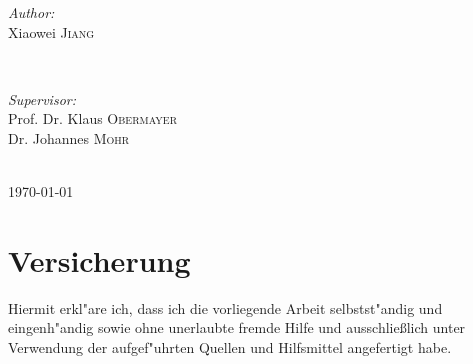 \documentclass[12pt,english,german,a4paper,twoside]{report}
\begin{document}
\begin{titlepage}
	\begin{minipage}{0.3\textwidth}
		\begin{flushleft} \large
			\emph{Author:}\\
			Xiaowei \textsc{Jiang} %
		\end{flushleft}
	\end{minipage}
	~
	\begin{minipage}{0.6\textwidth}
		\begin{flushright} \large
			\emph{Supervisor:} \\
			Prof. Dr. Klaus \textsc{Obermayer}\\
			Dr. Johannes \textsc{Mohr} %
		\end{flushright}
	\end{minipage}\\[4cm]
	
	
	
	{\large \today}\\[3cm] %
	
	
	
	
	\vfill %
	
\end{titlepage}
\newpage
\thispagestyle{empty}
\mbox{}
\chapter*{Versicherung}
Hiermit erkl"are ich, dass ich die vorliegende Arbeit selbstst"andig und eingenh"andig sowie ohne unerlaubte fremde Hilfe und ausschlie\ss lich unter Verwendung der aufgef"uhrten Quellen und Hilfsmittel angefertigt habe.
\end{document}
